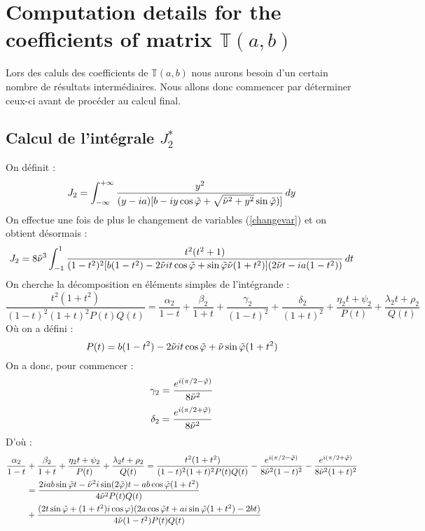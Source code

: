 \chapter{Computation details for the coefficients of matrix $\mathbb{T}(a,b)$}
\label{matT}
Lors des caluls des coefficients de $\mathbb{T}(a,b)$ nous aurons besoin d'un certain nombre de résultats intermédiaires. Nous allons donc commencer par déterminer ceux-ci avant de procéder au calcul final.

\section{Calcul de l'intégrale $J_2^*$}
\label{calculJ2}
On définit :
\begin{equation}
J_2 =\int_{-\infty}^{+\infty} \frac{y^2}{(y-ia)\lbrack b-iy\cos \tilde{\varphi}+ \sqrt{\tilde{\nu}^2+y^2} \sin \tilde{\varphi}) \rbrack} \, dy
\label{defJ2}
\end{equation}
On effectue une fois de plus le changement de variables (\ref{changevar}) et on obtient désormais :
$$J_2=8\tilde{\nu}^3 \int_{-1}^1 \frac{t^2(t^2+1)}{(1-t^2)^2\lbrack b(1-t^2)-2\tilde{\nu} it\cos\tilde{\varphi}+ \sin \tilde{\varphi} \tilde{\nu}(1+t^2)\rbrack(2\tilde{\nu} t-ia(1-t^2))}\, dt$$
On cherche la décomposition en éléments simples de l'intégrande :
$$\frac{t^2(1+t^2)}{(1-t)^2(1+t)^2P(t)Q(t)}=\frac{\alpha_2}{1-t}+\frac{\beta_2}{1+t}+\frac{\gamma_2}{(1-t)^2}+\frac{\delta_2}{(1+t)^2}+\frac{\eta_2 t+\psi_2}{P(t)}+\frac{\lambda_2 t +\rho_2}{Q(t)}$$
Où on a défini :
\begin{equation}
P(t)=b(1-t^2)-2\tilde{\nu} i t\cos\tilde{\varphi}+\tilde{\nu}\sin\tilde{\varphi}(1+t^2)
\end{equation}
On a donc, pour commencer :
$$ \gamma_2=\frac{e^{i(\pi/2-\tilde{\varphi})}}{8\tilde{\nu}^2}$$
$$\delta_2=\frac{e^{i(\pi/2+\tilde{\varphi})}}{8\tilde{\nu}^2}$$
D'où :
\begin{equation*}
\begin{split}
\frac{\alpha_2}{1-t}&+\frac{\beta_2}{1+t} +\frac{\eta_2 t+\psi_2}{P(t)}+\frac{\lambda_2 t +\rho_2}{Q(t)}=\frac{t^2(1+t^2)}{(1-t)^2(1+t)^2P(t)Q(t)}-\frac{e^{i(\pi/2-\tilde{\varphi})}}{8\tilde{\nu}^2(1-t)^2}-\frac{e^{i(\pi/2+\tilde{\varphi})}}{8\tilde{\nu}^2(1+t)^2}\\
&=\frac{2iab\sin\tilde{\varphi}t-\tilde{\nu}^2i\sin(2\tilde{\varphi})t-ab\cos\tilde{\varphi}(1+t^2)}{4\tilde{\nu}^2 P(t)Q(t)}\\ &+\frac{(2t\sin\tilde{\varphi}+(1+t^2)i\cos\varphi)(2a\cos\tilde{\varphi}t+ai\sin\tilde{\varphi}(1+t^2)-2bt)}{4\tilde{\nu}(1-t^2) P(t)Q(t)}
\end{split}
\end{equation*}



